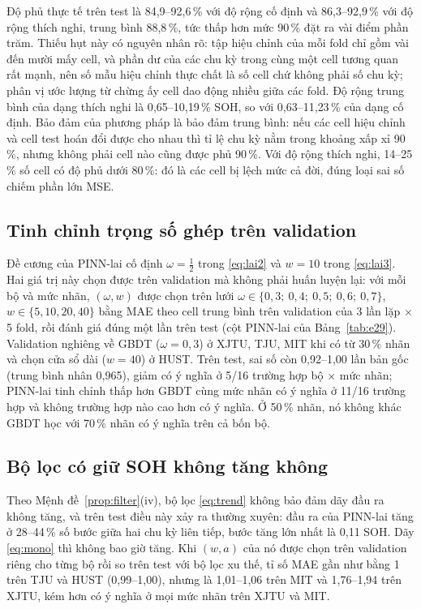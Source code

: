\documentclass[12pt,a4paper,oneside]{report}
\theoremstyle{plain}
\theoremstyle{definition}
\begin{document}
Độ phủ thực tế trên test là 84{,}9--92{,}6\,\% với độ rộng cố định và 86{,}3--92{,}9\,\% với độ rộng thích nghi, trung bình 88{,}8\,\%, tức thấp hơn mức 90\,\% đặt ra vài điểm phần trăm. Thiếu hụt này có nguyên nhân rõ: tập hiệu chỉnh của mỗi fold chỉ gồm vài đến mười mấy cell, và phần dư của các chu kỳ trong cùng một cell tương quan rất mạnh, nên số mẫu hiệu chỉnh thực chất là số cell chứ không phải số chu kỳ; phân vị ước lượng từ chừng ấy cell dao động nhiều giữa các fold.
Độ rộng trung bình của dạng thích nghi là 0{,}65--10{,}19\,\% SOH, so với 0{,}63--11{,}23\,\% của dạng cố định. Bảo đảm của phương
pháp là bảo đảm trung bình: nếu các cell hiệu chỉnh và cell test hoán đổi được cho nhau thì tỉ lệ chu kỳ nằm trong
khoảng xấp xỉ 90\,\%, nhưng không phải cell nào cũng được phủ 90\,\%. Với độ rộng thích nghi, 14--25\,\% số cell có độ
phủ dưới 80\,\%: đó là các cell bị lệch mức cả đời, đúng loại sai số chiếm phần lớn MSE.




\subsection{Tinh chỉnh trọng số ghép trên validation}\label{sec:tuned}

Đề cương của PINN-lai cố định $\omega = \tfrac12$ trong \eqref{eq:lai2} và $w = 10$ trong \eqref{eq:lai3}. Hai giá trị
này chọn được trên validation mà không phải huấn luyện lại: với mỗi bộ và mức nhãn, $(\omega, w)$ được chọn trên lưới
$\omega \in \{0{,}3;\ 0{,}4;\ 0{,}5;\ 0{,}6;\ 0{,}7\}$, $w \in \{5, 10, 20, 40\}$ bằng MAE theo cell trung bình trên
validation của 3 lần lặp $\times$ 5 fold, rồi đánh giá đúng một lần trên test (cột PINN-lai của Bảng~\ref{tab:e29}). Validation nghiêng
về GBDT ($\omega = 0{,}3$) ở XJTU, TJU, MIT khi có từ 30\,\% nhãn và chọn cửa sổ dài ($w = 40$) ở HUST. Trên test, sai
số còn 0{,}92--1{,}00 lần bản gốc (trung bình nhân 0{,}965), giảm có ý nghĩa ở 5/16 trường hợp bộ × mức nhãn; PINN-lai
tinh chỉnh thấp hơn GBDT cùng mức nhãn có ý nghĩa ở 11/16 trường hợp và không trường hợp nào cao hơn có ý nghĩa. Ở 50\,\% nhãn, nó không khác GBDT học với
70\,\% nhãn có ý nghĩa trên cả bốn bộ.



\subsection{Bộ lọc có giữ SOH không tăng không}\label{sec:monores}

Theo Mệnh đề~\ref{prop:filter}(iv), bộ lọc \eqref{eq:trend} không bảo đảm dãy đầu ra không tăng, và trên test điều này
xảy ra thường xuyên: đầu ra của PINN-lai tăng ở 28--44\,\% số bước giữa hai chu kỳ liên tiếp, bước tăng lớn nhất là
0{,}11 SOH. Dãy \eqref{eq:mono} thì không bao giờ tăng. Khi $(w, a)$ của nó được chọn trên validation riêng cho từng
bộ rồi so trên test với bộ lọc xu thế, tỉ số MAE gần như bằng 1 trên TJU và HUST (0{,}99--1{,}00), nhưng là 1{,}01--1{,}06 trên MIT và
1{,}76--1{,}94 trên XJTU, kém hơn có ý nghĩa ở mọi mức nhãn trên XJTU và MIT.
\end{document}
